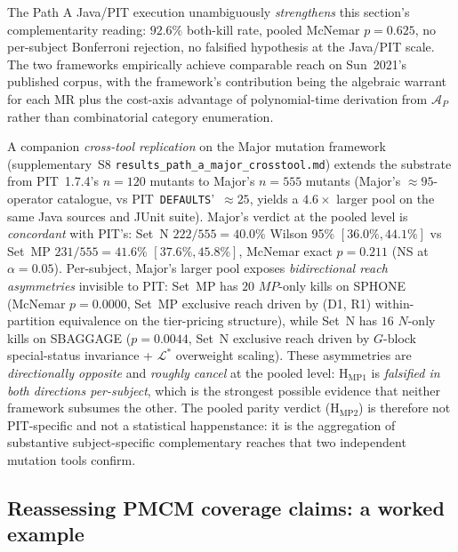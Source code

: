 \documentclass[manuscript]{acmart}
\begin{document}
The Path A Java/PIT execution unambiguously \emph{strengthens} this
section's complementarity reading: $92.6\%$ both-kill rate, pooled
McNemar $p = 0.625$, no per-subject Bonferroni rejection, no
falsified hypothesis at the Java/PIT scale. The two frameworks
empirically achieve comparable reach on Sun~2021's published
corpus, with the framework's contribution being the algebraic
warrant for each MR plus the cost-axis advantage of polynomial-time
derivation from $\mathcal{A}_P$ rather than combinatorial category
enumeration.

A companion \emph{cross-tool replication} on the Major mutation framework
(supplementary~S8 \texttt{results\_path\_a\_major\_crosstool.md}) extends the
substrate from PIT~1.7.4's $n = 120$ mutants to Major's $n = 555$ mutants
(Major's $\approx 95$-operator catalogue, vs PIT~\texttt{DEFAULTS}'~$\approx 25$,
yields a $4.6\times$ larger pool on the same Java sources and JUnit suite).
Major's verdict at the pooled level is \emph{concordant} with PIT's:
Set~N $222/555 = 40.0\%$ Wilson 95\% $[36.0\%, 44.1\%]$ vs Set~MP
$231/555 = 41.6\%$ $[37.6\%, 45.8\%]$, McNemar exact $p = 0.211$ (NS at
$\alpha = 0.05$). Per-subject, Major's larger pool exposes
\emph{bidirectional reach asymmetries} invisible to PIT: Set~MP has
$20$ $MP$-only kills on SPHONE (McNemar $p = 0.0000$, Set~MP exclusive
reach driven by (D1, R1) within-partition equivalence on the tier-pricing
structure), while Set~N has $16$ $N$-only kills on SBAGGAGE
($p = 0.0044$, Set~N exclusive reach driven by $G$-block special-status
invariance + $\mathcal{L}^{*}$ overweight scaling). These asymmetries are
\emph{directionally opposite} and \emph{roughly cancel} at the pooled
level: H$_{\mathrm{MP1}}$ is \emph{falsified in both directions per-subject},
which is the strongest possible evidence that neither framework subsumes
the other. The pooled parity verdict (H$_{\mathrm{MP2}}$) is therefore not
PIT-specific and not a statistical happenstance: it is the aggregation of
substantive subject-specific complementary reaches that two independent
mutation tools confirm.

\subsection{Reassessing PMCM coverage claims: a worked example}
\label{subsec:pmcm-worked}
\end{document}

